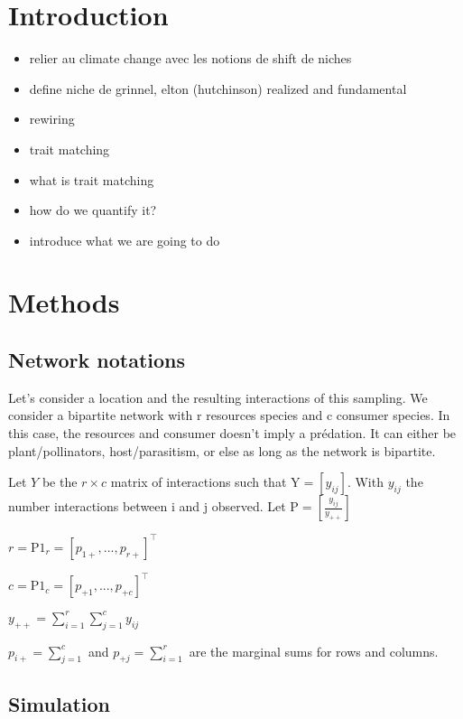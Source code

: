 \documentclass{article}
\begin{document}
\section{Introduction}

\begin{itemize}
    \item relier au climate change avec les notions de shift de niches
    \item define niche de grinnel, elton (hutchinson) realized and fundamental
    \item rewiring
    \item trait matching
        \item what is trait matching
        \item how do we quantify it?
    \item introduce what we are going to do
\end{itemize}

\section{Methods}

\subsection{Network notations}
Let's consider a location and the resulting interactions of this sampling. We consider a bipartite network with r resources species and c consumer species. In this case, the resources and consumer doesn't imply a prédation. It can either be plant/pollinators, host/parasitism, or else as long as the network is bipartite. 

Let $Y$ be the $r\times c$ matrix of interactions such that $\textrm{Y} = [y_{ij}]$. With $y_{ij}$ the number interactions between i and j observed.
Let $\textrm{P}=[\frac{y_{ij}}{y_{++}}]$

$r=\textrm{P1}_r =[p_{1+}, ..., p_{r+}]^\intercal$

$c=\textrm{P1}_c=[p_{+1}, ..., p_{+c}]^\intercal$

$y_{++}=\sum_{i=1}^{r}\sum_{j=1}^{c}y_{ij}$

$p_{i+}=\sum_{j=1}^{c}$ and $p_{+j}=\sum_{i=1}^{r}$ are the marginal sums for rows and columns.

\subsection{Simulation}
\end{document}
